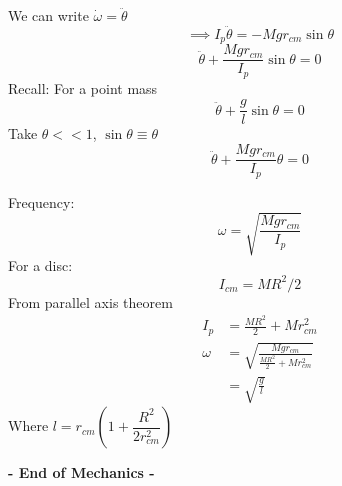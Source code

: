 \documentclass[twoside]{scrartcl}
\begin{document}
We can write $\dot{\omega} = \ddot{\theta}$
\[\implies I_p\ddot{\theta} = -Mgr_{cm}\sin\theta\]
\[\ddot{\theta} + \frac{Mgr_{cm}}{I_p}\sin\theta = 0\]
Recall: For a point mass 
\[\ddot{\theta} + \frac{g}{l}\sin\theta = 0 \]
Take $\theta << 1$, $\sin\theta \equiv \theta$
\[\ddot{\theta} + \frac{Mgr_{cm}}{I_p}\theta = 0\]

Frequency:
\[\omega = \sqrt{\frac{Mgr_{cm}}{I_p}}\]
For a disc:
\[I_{cm} = MR^2/2\]
From parallel axis theorem
\[\begin{aligned}
I_p &= \frac{MR^2}{2} + Mr^2_{cm}\\
\omega &= \sqrt{\frac{Mgr_{cm}}{\frac{MR^2}{2}+Mr^2_{cm}}}\\
&= \sqrt{\frac{g}{l}}	
\end{aligned}
\]
Where $l = r_{cm}\left(1+\dfrac{R^2}{2r_{cm}^2}\right)$~\\


  \begin{center}
  \textsf{\textbf{- End of Mechanics -}}	
  \end{center}
  
  


\end{document}
